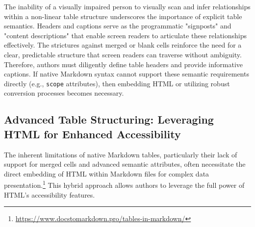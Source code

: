\begin{itemize}[noitemsep,topsep=0pt]
\end{itemize}
The inability of a visually impaired person to visually scan and infer relationships within a non-linear table structure underscores the importance of explicit table semantics. Headers and captions serve as the programmatic "signposts" and "content descriptions" that enable screen readers to articulate these relationships effectively. The strictures against merged or blank cells reinforce the need for a clear, predictable structure that screen readers can traverse without ambiguity. Therefore, authors must diligently define table headers and provide informative captions. If native Markdown syntax cannot support these semantic requirements directly (e.g., \texttt{scope} attributes), then embedding HTML or utilizing robust conversion processes becomes necessary.

\subsection{Advanced Table Structuring: Leveraging HTML for Enhanced Accessibility}
The inherent limitations of native Markdown tables, particularly their lack of support for merged cells and advanced semantic attributes, often necessitate the direct embedding of HTML within Markdown files for complex data presentation.\footnote{\url{https://www.docstomarkdown.pro/tables-in-markdown/}} This hybrid approach allows authors to leverage the full power of HTML's accessibility features.

